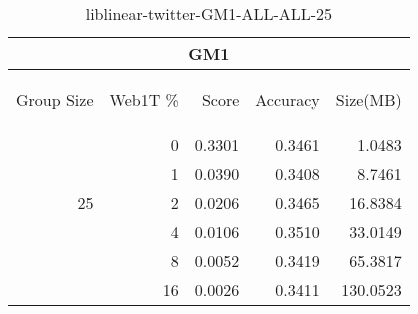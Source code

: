 \begin{center}
\begin{table}[htbp]
\begin{tabular}{ | r | r | r | r | r |}
\hline
\multicolumn{5}{|c|}{GM1}\\
\hline
\begin{sideways}Group Size\end{sideways} & \begin{sideways}Web1T \%\end{sideways} & \begin{sideways}Score\end{sideways} & \begin{sideways}Accuracy\end{sideways} & \begin{sideways}Size(MB)\end{sideways}\\
\hline
\multirow{5}{*}{25}
 & 0 & 0.3301 & 0.3461 & 1.0483\\ \cline{2-5}
 & 1 & 0.0390 & 0.3408 & 8.7461\\ \cline{2-5}
 & 2 & 0.0206 & 0.3465 & 16.8384\\ \cline{2-5}
 & 4 & 0.0106 & 0.3510 & 33.0149\\ \cline{2-5}
 & 8 & 0.0052 & 0.3419 & 65.3817\\ \cline{2-5}
 & 16 & 0.0026 & 0.3411 & 130.0523\\ \cline{2-5}
\hline
\end{tabular}
\caption{liblinear-twitter-GM1-ALL-ALL-25}
\label{table:liblinear-twitter-GM1-ALL-ALL-25}
\end{table}
\end{center}

